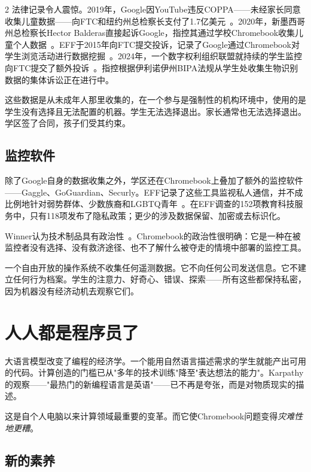 \documentclass[11pt, a4paper]{article}
\begin{document}
\begin{multicols}{2}
法律记录令人震惊。2019年，Google因YouTube违反COPPA——未经家长同意收集儿童数据——向FTC和纽约州总检察长支付了1.7亿美元~\citep{google2019coppa}。2020年，新墨西哥州总检察长Hector Balderas直接起诉Google，指控其通过学校Chromebook收集儿童个人数据~\citep{newmexico2020google}。EFF于2015年向FTC提交投诉，记录了Google通过Chromebook对学生浏览活动进行数据挖掘~\citep{eff2015chromebook}。2024年，一个数字权利组织联盟就持续的学生监控向FTC提交了额外投诉~\citep{eff2024monitoring}。指控根据伊利诺伊州BIPA法规从学生处收集生物识别数据的集体诉讼正在进行中。

这些数据是从未成年人那里收集的，在一个参与是强制性的机构环境中，使用的是学生没有选择且无法配置的机器。学生无法选择退出。家长通常也无法选择退出。学区签了合同，孩子们受其约束。

\subsection{监控软件}

除了Google自身的数据收集之外，学区还在Chromebook上叠加了额外的监控软件——Gaggle、GoGuardian、Securly。EFF记录了这些工具监视私人通信，并不成比例地针对弱势群体、少数族裔和LGBTQ青年~\citep{eff2024monitoring}。在EFF调查的152项教育科技服务中，只有118项发布了隐私政策；更少的涉及数据保留、加密或去标识化。

Winner认为技术制品具有政治性~\citep{winner1980artifacts}。Chromebook的政治性很明确：它是一种在被监控者没有选择、没有救济途径、也不了解什么被夺走的情境中部署的监控工具。

一个自由开放的操作系统不收集任何遥测数据。它不向任何公司发送信息。它不建立任何行为档案。学生的注意力、好奇心、错误、探索——所有这些都保持私密，因为机器没有经济动机去观察它们。


\section{人人都是程序员了}

大语言模型改变了编程的经济学。一个能用自然语言描述需求的学生就能产出可用的代码。计算创造的门槛已从"多年的技术训练"降至"表达想法的能力"。Karpathy的观察——"最热门的新编程语言是英语"——已不再是夸张，而是对物质现实的描述。

这是自个人电脑以来计算领域最重要的变革。而它使Chromebook问题变得\emph{灾难性地更糟}。

\subsection{新的素养}


\end{multicols}
\end{document}
